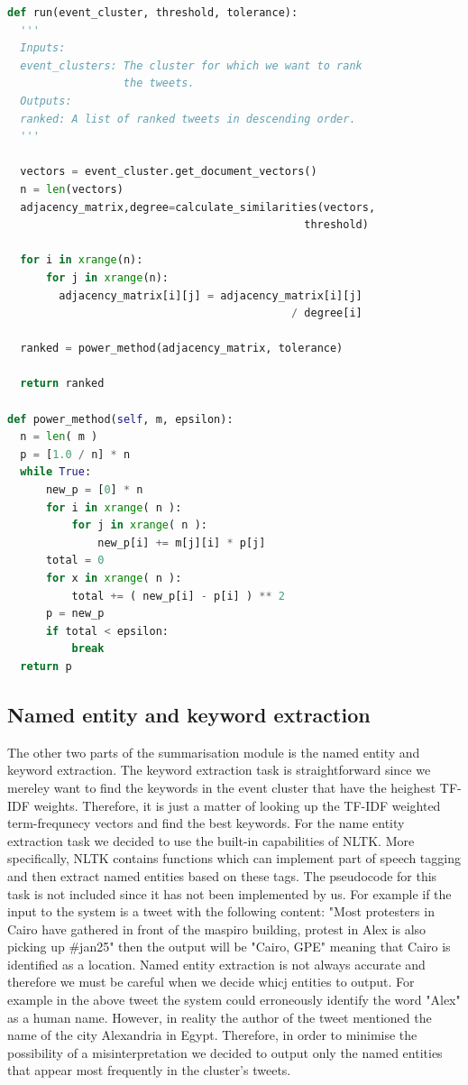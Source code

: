 \begin{lstlisting}[language=Python, label=CentroidSummariserSnippet, caption=Pseudocode for the centoid-based summariser.]
def run(event_cluster, threshold, tolerance):
  '''
  Inputs:
  event_clusters: The cluster for which we want to rank 
                  the tweets.
  Outputs:
  ranked: A list of ranked tweets in descending order. 
  '''        

  vectors = event_cluster.get_document_vectors()      
  n = len(vectors)
  adjacency_matrix,degree=calculate_similarities(vectors, 
                                              threshold)
  
  for i in xrange(n):
      for j in xrange(n):
        adjacency_matrix[i][j] = adjacency_matrix[i][j] 
                                            / degree[i]
                                            
  ranked = power_method(adjacency_matrix, tolerance)        
  
  return ranked
    
def power_method(self, m, epsilon):
  n = len( m )
  p = [1.0 / n] * n
  while True:
      new_p = [0] * n
      for i in xrange( n ):
          for j in xrange( n ):
              new_p[i] += m[j][i] * p[j]
      total = 0
      for x in xrange( n ):
          total += ( new_p[i] - p[i] ) ** 2
      p = new_p
      if total < epsilon:
          break
  return p  
\end{lstlisting}

\subsection{Named entity and keyword extraction}
The other two parts of the summarisation module is the named entity and keyword extraction. The keyword extraction task is straightforward since we mereley want to 
find the keywords in the event cluster that have the heighest TF-IDF weights. Therefore, it is just a matter of looking up the TF-IDF weighted term-frequnecy vectors and 
find the best keywords. For the name entity extraction task we decided to use the built-in capabilities of NLTK. More specifically, NLTK contains functions which can implement part of speech tagging and then extract named entities based on these tags. The pseudocode for this task is not included since it has not been implemented by us. For example if the input to the system is a tweet with the following content: "Most protesters in Cairo have gathered in front of the maspiro building, protest in Alex is also picking up ‪\#jan25" then the output will be "Cairo, GPE" meaning that Cairo is identified as a location. Named entity extraction is not always accurate and therefore we must be careful when we decide whicj entities to output. For example in the above tweet the system could erroneously identify the word "Alex" as a human name. However, in reality the author of the tweet mentioned the name of the city Alexandria in Egypt. Therefore, in order to minimise the possibility of a misinterpretation we decided to output only the named entities that appear most frequently in the cluster's tweets. 

